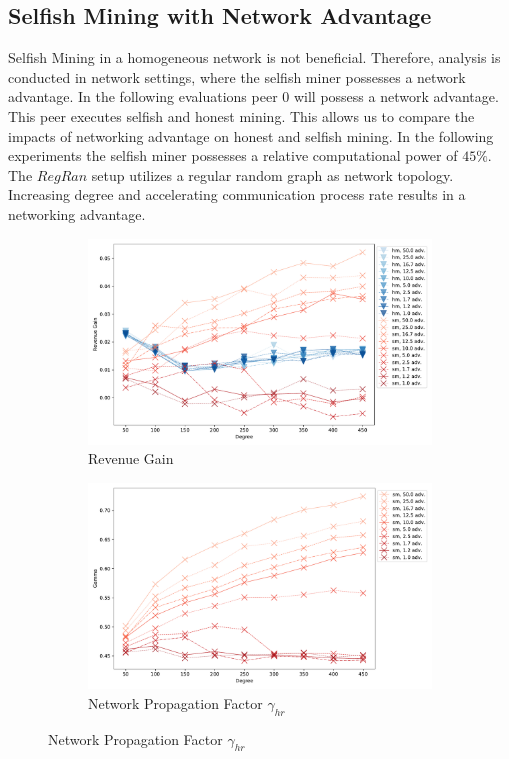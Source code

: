 \subsection{Selfish Mining with Network Advantage}
Selfish Mining in a homogeneous network is not beneficial. Therefore, analysis is conducted in network settings, where the selfish miner possesses a network advantage. In the following evaluations peer $0$ will possess a network advantage. This peer executes selfish and honest mining. This allows us to compare the impacts of networking advantage on honest and selfish mining. In the following experiments the selfish miner possesses a relative computational power of $45\% $.
The $RegRan$ setup utilizes a regular random graph as network topology. Increasing degree and accelerating communication process rate results in a networking advantage.
\begin{figure}[tbp]
	 \begin{subfigure}[b]{\textwidth}
		\includegraphics[width=\textwidth]{figures/sm_edge_new_revenue.pdf}
		\caption{Revenue Gain}
		\label{fig:sm_edge_rev}
	\end{subfigure}
	\hfill
	\begin{subfigure}[b]{\textwidth}
		\includegraphics[width=\textwidth]{figures/sm_edge_new_gamma.pdf}
		\caption{Network Propagation Factor $\gamma_{hr}$}
		\label{fig:sm_edge_gamma}
	\end{subfigure}
\end{figure}
